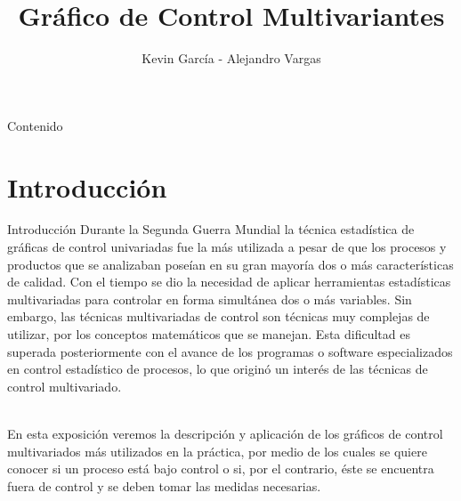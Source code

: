 \documentclass[10pt]{beamer}
\author{Kevin García - Alejandro Vargas}
\title{Gráfico de Control Multivariantes}
\begin{document}
\begin{frame}[plain]
\maketitle
\end{frame}

\begin{frame}{Contenido}
\tableofcontents
\end{frame}

\section{Introducción}
\begin{frame}{Introducción}
Durante la Segunda Guerra Mundial la técnica estadística de gráficas de control univariadas fue la más utilizada a pesar de que los procesos y productos que se analizaban poseían en su gran mayoría dos o más características de calidad. Con el tiempo se dio la necesidad de aplicar herramientas estadísticas multivariadas para controlar en forma simultánea dos o más variables. Sin embargo, las técnicas multivariadas de control son técnicas muy complejas de utilizar, por los conceptos matemáticos que se manejan. Esta dificultad es superada posteriormente con el avance de los programas o software especializados en control estadístico de procesos, lo que originó un interés de las técnicas de control multivariado. 

~\\En esta exposición veremos la descripción y aplicación de los gráficos de control multivariados más utilizados en la práctica, por medio de los cuales se quiere conocer si un proceso está bajo control o si, por el contrario, éste se encuentra fuera de control y se deben tomar las medidas necesarias.
\end{frame}
\end{document}
